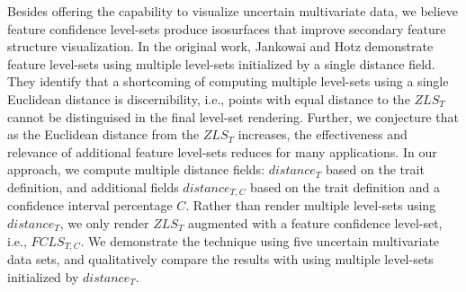 Besides offering the capability to visualize uncertain multivariate data, we believe feature confidence level-sets 
produce isosurfaces that improve secondary feature structure visualization.
%
In the original work, Jankowai and Hotz demonstrate feature level-sets using multiple level-sets initialized by a single distance field.
%
They identify that a shortcoming of computing multiple level-sets using a single Euclidean distance is discernibility, i.e., points with equal distance to the $ZLS_{T}$ cannot be distinguised in the final level-set rendering.
%
Further, we conjecture that as the Euclidean distance from the $ZLS_{T}$ increases, the effectiveness and relevance of additional feature level-sets reduces for many applications.
%
In our approach, we compute multiple distance fields: $distance_{T}$ based on the trait definition, and additional fields $distance_{T,C}$ based on the trait definition and a confidence interval percentage $C$. 
%
Rather than render multiple level-sets using $distance_{T}$, we only render $ZLS_{T}$ augmented with a feature confidence level-set, i.e., $FCLS_{T,C}$.
%
We demonstrate the technique using five uncertain multivariate data sets, and qualitatively compare the results with using multiple level-sets initialized by $distance_{T}$.

